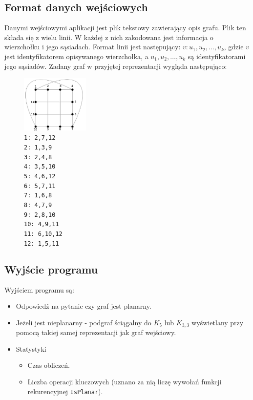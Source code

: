 \documentclass[a4 122pt]{article}
\begin{document}
	\subsection{Format danych wejściowych}
		Danymi wejściowymi aplikacji jest plik tekstowy zawierający opis grafu. Plik ten składa się z wielu linii. W każdej z nich zakodowana jest informacja o wierzchołku i jego sąsiadach. Format linii jest następujący:
		$v: u_1, u_2, \dots , u_k$, gdzie $v$ jest identyfikatorem opisywanego wierzchołka, a $u_1, u_2, \dots , u_k$ są identyfikatorami jego sąsiadów.
		Zadany graf w przyjętej reprezentacji wygląda następująco:
		\begin{figure}
			\centering
			\includegraphics[width=0.3\textwidth]{include/graf.png}
			\caption*
{
\texttt{1: 2,7,12\\
2: 1,3,9\\
3: 2,4,8\\
4: 3,5,10\\
5: 4,6,12\\
6: 5,7,11\\
7: 1,6,8\\
8: 4,7,9\\
9: 2,8,10\\
10: 4,9,11\\
11: 6,10,12\\
12: 1,5,11}}
		\end{figure}
	\subsection{Wyjście programu}
	Wyjściem programu są:
	\begin{itemize}
	\item Odpowiedź na pytanie czy graf jest planarny.
	\item Jeżeli jest nieplanarny -  podgraf ściągalny do $K_5$ lub $K_{3,3}$ wyświetlany przy pomocą takiej samej reprezentacji jak graf wejściowy.
	\item Statystyki
		\begin{itemize}
		\item Czas obliczeń.
		\item Liczba operacji kluczowych (uznano za nią liczę wywołań funkcji rekurencyjnej \texttt{IsPlanar}).
		\end{itemize}
	\end{itemize}
\end{document}

